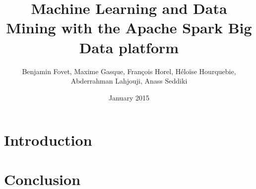 \documentclass[12pt]{article}
\title{Machine Learning and Data Mining with the Apache Spark Big Data platform}
\author{Benjamin Fovet, Maxime Gasque, François Horel, Héloïse Hourquebie, Abderrahman Lahjouji, Anass Seddiki}
\affil{\texttt{\{bfovet, mgasque, fhorel, hhourquebie, alahjouji, aseddiki\} @enseirb-matmeca.fr}}
\date{January 2015}
\begin{document}
\maketitle

\abstract{}

\tableofcontents

\section{Introduction}

\section{Conclusion}



\end{document}
